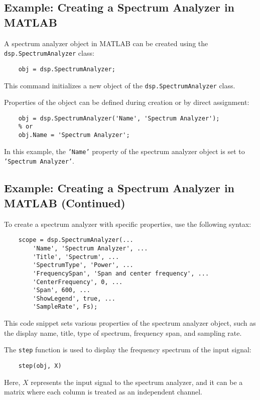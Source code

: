 \subsection*{Example: Creating a Spectrum Analyzer in MATLAB}

A spectrum analyzer object in MATLAB can be created using the \texttt{dsp.SpectrumAnalyzer} class:
\begin{verbatim}
    obj = dsp.SpectrumAnalyzer;
\end{verbatim}
This command initializes a new object of the \texttt{dsp.SpectrumAnalyzer} class.

Properties of the object can be defined during creation or by direct assignment:
\begin{verbatim}
    obj = dsp.SpectrumAnalyzer('Name', 'Spectrum Analyzer');
    % or
    obj.Name = 'Spectrum Analyzer';
\end{verbatim}
In this example, the \texttt{'Name'} property of the spectrum analyzer object is set to \texttt{'Spectrum Analyzer'}.


\subsection*{Example: Creating a Spectrum Analyzer in MATLAB (Continued)}

To create a spectrum analyzer with specific properties, use the following syntax:
\begin{verbatim}
    scope = dsp.SpectrumAnalyzer(...
        'Name', 'Spectrum Analyzer', ...
        'Title', 'Spectrum', ...
        'SpectrumType', 'Power', ...
        'FrequencySpan', 'Span and center frequency', ...
        'CenterFrequency', 0, ...
        'Span', 600, ...
        'ShowLegend', true, ...
        'SampleRate', Fs);
\end{verbatim}
This code snippet sets various properties of the spectrum analyzer object, such as the display name, title, type of spectrum, frequency span, and sampling rate.

The \texttt{step} function is used to display the frequency spectrum of the input signal:
\begin{verbatim}
    step(obj, X)
\end{verbatim}
Here, \( X \) represents the input signal to the spectrum analyzer, and it can be a matrix where each column is treated as an independent channel.

